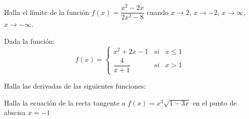 \documentclass[addpoints,spanish, 12pt,a4paper]{exam}
\begin{document}
\begin{questions}

%
%
%

\question[2] Halla el límite de la función $f(x)=\dfrac{x^2-2x}{2x^2-8}$ cuando $x\to 2$, $x\to -2$, $x\to \infty$, $x\to -\infty$.

\question Dada la función: $$f(x)=\left\{ \begin{matrix}
x^2+2x-1 &  si & x\leq 1 \\
\dfrac{4}{x+1} &  si & x > 1
\end{matrix}\right.$$

\question Halla las derivadas de las siguientes funciones:
 
\question[2] Halla la ecuación de la recta tangente a $f(x)=x^2\sqrt{1-3x}$ en el punto de abscisa $x=-1$


\end{questions}
\end{document}
